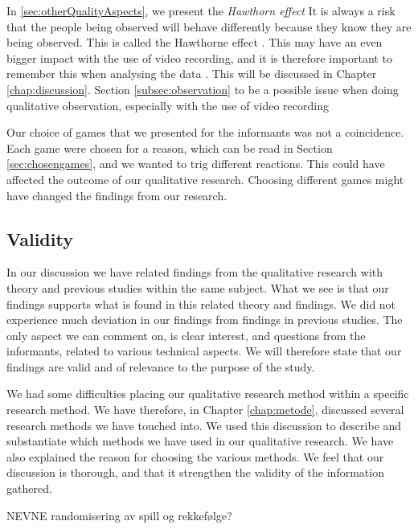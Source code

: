 In \ref{sec:otherQualityAspects}, we present the \emph{Hawthorn effect} 
It is always a risk that the people being observed will behave differently because they know they are being observed. This is called the Hawthorne effect \cite{interview}. This may have an even bigger impact with the use of video recording, and it is therefore important to remember this when analysing the data \cite{tjora}. This will be discussed in Chapter \ref{chap:discussion}. Section \ref{subsec:observation} to be a possible issue when doing qualitative observation, especially with the use of video recording

Our choice of games that we presented for the informants was not a coincidence. Each game were chosen for a reason, which can be read in Section \ref{sec:chosengames}, and we wanted to trig different reactions. This could have affected the outcome of our qualitative research. Choosing different games might have changed the findings from our research.  

\subsection{Validity}

In our discussion we have related findings from the qualitative research with theory and previous studies within the same subject. What we see is that our findings supports what is found in this related theory and findings. We did not experience much deviation in our findings from findings in previous studies. The only aspect we can comment on, is clear interest, and questions from the informants, related to various technical aspects. We will therefore state that our findings are valid and of relevance to the purpose of the study. 

We had some difficulties placing our qualitative research method within a specific research method. We have therefore, in Chapter \ref{chap:metode}, discussed several research methods we have touched into. We used this discussion to describe and substantiate which methods we have used in our qualitative research. We have also explained the reason for choosing the various methods. We feel that our discussion is thorough, and that it strengthen the validity of the information gathered. 

NEVNE randomisering av spill og rekkefølge?
    
